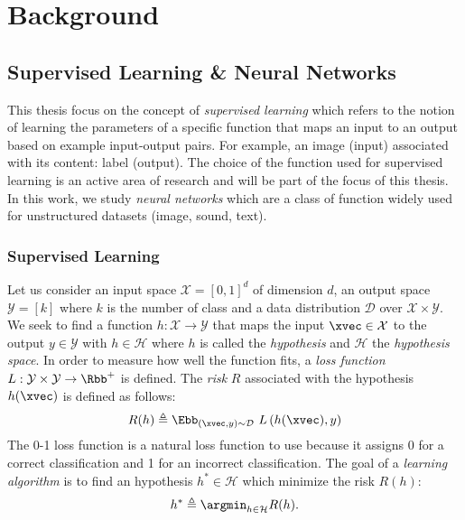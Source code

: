 \chapter{Background}
\label{chapter:background}
\localtableofcontents

\section{Supervised Learning \& Neural Networks}
\label{secction:ch2-supervised_learning_neural_networks}

This thesis focus on the concept of \emph{supervised learning} which refers to the notion of learning the parameters of a specific function that maps an input to an output based on example input-output pairs.
For example, an image (input) associated with its content: label (output).
The choice of the function used for supervised learning is an active area of research and will be part of the focus of this thesis.
In this work, we study \emph{neural networks} which are a class of function widely used for unstructured datasets (image, sound, text).

\subsection{Supervised Learning}
\label{subsection:ch2-supervised_learning}

Let us consider an input space $\mathcal{X} = [0, 1]^d$ of dimension $d$, an output space $\mathcal{Y} = [k]$ where $k$ is the number of class and a data distribution $\mathcal{D}$ over $\mathcal{X} \times \mathcal{Y}$.
We seek to find a function $h: \mathcal{X} \rightarrow \mathcal{Y}$ that maps the input $\xvec \in \mathcal{X}$ to the output $y \in \mathcal{Y}$ with $h \in \mathcal{H}$ where $h$ is called the \emph{hypothesis} and $\mathcal{H}$ the \emph{hypothesis space}.
In order to measure how well the function fits, a \emph{loss function} $L: \mathcal{Y} \times \mathcal{Y} \rightarrow \Rbb^{+}$ is defined.
The \emph{risk} $R$ associated with the hypothesis $h(\xvec)$ is defined as follows:
\begin{equation}
  R(h) \triangleq \Ebb_{(\xvec, y) \sim \mathcal{D}}\  L \left( h(\xvec), y \right)
\end{equation}
The 0-1 loss function is a natural loss function to use because it assigns 0 for a correct classification and 1 for an incorrect classification. 
The goal of a \emph{learning algorithm} is to find an hypothesis $h^* \in \mathcal{H}$ which minimize the risk $R(h)$:
\begin{equation}
  h^* \triangleq \argmin_{h \in \mathcal{H}} R(h) .
\end{equation}


